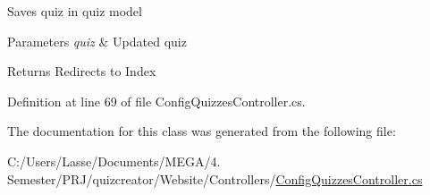 Saves quiz in quiz model 


\begin{DoxyParams}{Parameters}
{\em quiz} & Updated quiz\\
\hline
\end{DoxyParams}
\begin{DoxyReturn}{Returns}
Redirects to Index
\end{DoxyReturn}


Definition at line 69 of file Config\+Quizzes\+Controller.\+cs.



The documentation for this class was generated from the following file\+:\begin{DoxyCompactItemize}
\item 
C\+:/\+Users/\+Lasse/\+Documents/\+M\+E\+G\+A/4. Semester/\+P\+R\+J/quizcreator/\+Website/\+Controllers/\hyperlink{_config_quizzes_controller_8cs}{Config\+Quizzes\+Controller.\+cs}\end{DoxyCompactItemize}
